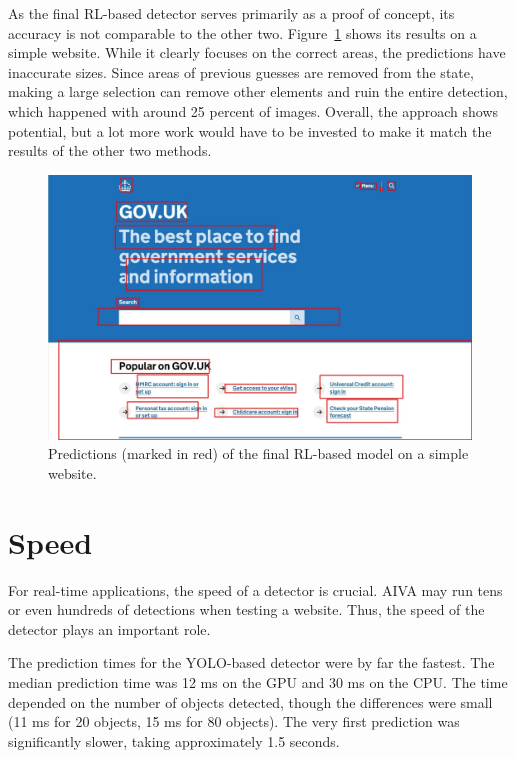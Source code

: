 \documentclass[
  digital,     %
  oneside,     %
  nosansbold,  %
  nocolorbold, %
  lof,         %
  lot,         %
]{fithesis4}
\begin{document}
\break
As the final RL-based detector serves primarily as a proof of concept, its accuracy is not comparable to the other two. Figure~\ref{fig:gov_predict_rl} shows its results on a simple website. While it clearly focuses on the correct areas, the predictions have inaccurate sizes. Since areas of previous guesses are removed from the state, making a large selection can remove other elements and ruin the entire detection, which happened with around 25 percent of images. Overall, the approach shows potential, but a lot more work would have to be invested to make it match the results of the other two methods.

\begin{figure}[hb]
    \centering
    \includegraphics[width=1\linewidth]{results/rl_pred_gov.jpg}
    \caption{Predictions (marked in red) of the final RL-based model on a simple website.}
    \label{fig:gov_predict_rl}
\end{figure}

\section{Speed}
\label{sec:speed}

For real-time applications, the speed of a detector is crucial. AIVA may run tens or even hundreds of detections when testing a website. Thus, the speed of the detector plays an important role.

The prediction times for the YOLO-based detector were by far the fastest. The median prediction time was 12 ms on the GPU and 30 ms on the CPU. The time depended on the number of objects detected, though the differences were small (11 ms for 20 objects, 15 ms for 80 objects). The very first prediction was significantly slower, taking approximately 1.5 seconds.
\end{document}
